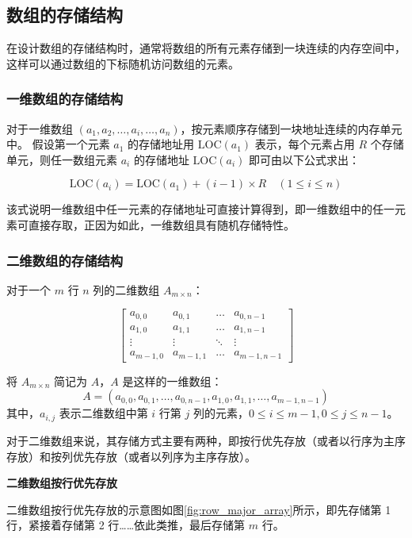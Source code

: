 \documentclass[lang=cn,newtx,10pt,scheme=chinese]{../elegantbook}
\begin{document}
\subsection{数组的存储结构}

在设计数组的存储结构时，通常将数组的所有元素存储到一块连续的内存空间中，这样可以通过数组的下标随机访问数组的元素。
\subsubsection{一维数组的存储结构}

对于一维数组 $(a_1, a_2, \dots, a_i, \dots, a_n)$，按元素顺序存储到一块地址连续的内存单元中。  
假设第一个元素 $a_1$ 的存储地址用 $\text{LOC}(a_1)$ 表示，每个元素占用 $R$ 个存储单元，则任一数组元素 $a_i$ 的存储地址 $\text{LOC}(a_i)$ 即可由以下公式求出：

\begin{equation}
    \text{LOC}(a_i) = \text{LOC}(a_1) + (i - 1) \times R \quad (1 \leq i \leq n)
\end{equation}

该式说明一维数组中任一元素的存储地址可直接计算得到，即一维数组中的任一元素可直接存取，正因为如此，一维数组具有随机存储特性。
\subsubsection{二维数组的存储结构}

对于一个 $m$ 行 $n$ 列的二维数组 $A_{m \times n}$：

\[
\begin{bmatrix}
a_{0,0} & a_{0,1} & \dots & a_{0,n-1} \\
a_{1,0} & a_{1,1} & \dots & a_{1,n-1} \\
\vdots & \vdots & \ddots & \vdots \\
a_{m-1,0} & a_{m-1,1} & \dots & a_{m-1,n-1}
\end{bmatrix}
\]

将 $A_{m \times n}$ 简记为 $A$，$A$ 是这样的一维数组：
\[
A = (a_{0,0}, a_{0,1}, \dots, a_{0,n-1}, a_{1,0}, a_{1,1}, \dots, a_{m-1,n-1})
\]
其中，$a_{i,j}$ 表示二维数组中第 $i$ 行第 $j$ 列的元素，$0 \leq i \leq m -1 , 0 \leq j \leq n-1$。

对于二维数组来说，其存储方式主要有两种，即按行优先存放（或者以行序为主序存放）和按列优先存放（或者以列序为主序存放）。

\textbf{二维数组按行优先存放}

二维数组按行优先存放的示意图如图\ref{fig:row_major_array}所示，即先存储第 1 行，紧接着存储第 2 行……依此类推，最后存储第 $m$ 行。
\end{document}
